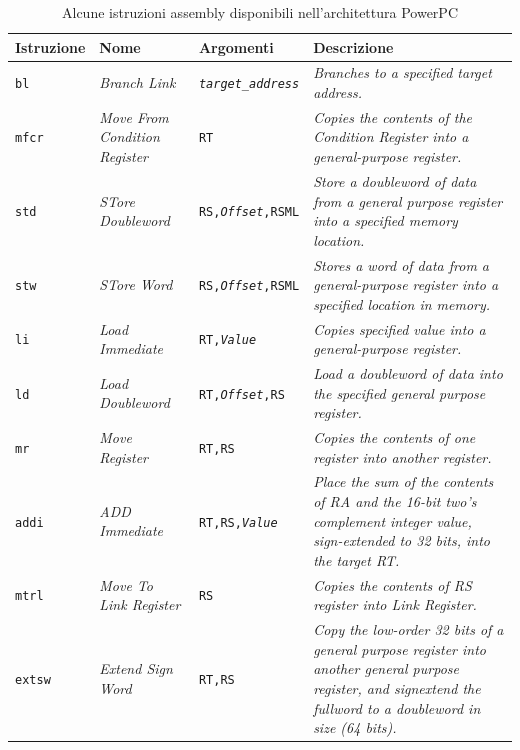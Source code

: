 \documentclass[10pt,a4paper, titlepage]{report}
\begin{document}
	\begin{table}[h!]
	    \caption{Alcune istruzioni assembly disponibili nell'architettura PowerPC\texttrademark}
	    \centering
	    
	    \label{tab:AssemblyIstrucions}
	    \begin{adjustbox}{center=\textwidth}
	    \begin{tabular}{l|l|l|p{6cm}}
	      \toprule
	      Istruzione & Nome & Argomenti & Descrizione \\
	   		\midrule
	   		\texttt{bl} & \textit{Branch Link} & \texttt{\textit{target\_address}} & \textit{Branches to a specified target address.} \\
	   	\hline
   	       \texttt{mfcr} & \textit{Move From Condition Register} & \texttt{RT} & \textit{Copies the contents of the Condition Register into a general-purpose register.} \\
 \hline
	       \texttt{std} & \textit{STore Doubleword} & \texttt{RS,\textit{Offset},RSML} & \textit{Store a doubleword of data from a general purpose register into a specified memory location.}\\
	      \hline 
	       \texttt{stw} & \textit{STore Word} & \texttt{RS,\textit{Offset},RSML} & \textit{Stores a word of data from a general-purpose register into a specified location in memory.} \\
	       \hline
	       \texttt{li} & \textit{Load Immediate} & \texttt{RT,\textit{Value}} & \textit{Copies specified value into a general-purpose register.} \\
	       \hline
	       \texttt{ld} & \textit{Load Doubleword} & \texttt{RT,\textit{Offset},RS} & \textit{Load a doubleword of data into the specified general purpose register.} \\
	       \hline
	       \texttt{mr} & \textit{Move Register} & \texttt{RT,RS} & \textit{Copies the contents of one register into another register.} \\
	       \hline
	       \texttt{addi} & \textit{ADD Immediate} & \texttt{RT,RS,\textit{Value}} & \textit{Place the sum of the contents of RA and the 16-bit two's complement integer value, sign-extended to 32 bits, into the target RT.} \\
	       	\hline
	       	\texttt{mtrl} & \textit{Move To Link Register} & \texttt{RS} & \textit{Copies the contents of RS register into Link Register.} \\
\hline
\texttt{extsw} & \textit{Extend Sign Word} & \texttt{RT,RS} & \textit{Copy the low-order 32 bits of a general purpose register into another general purpose register, and signextend the fullword to a doubleword in size (64 bits).} \\
	       	
	     
	      \bottomrule
	    \end{tabular}
	       \end{adjustbox}
	\end{table}
\end{document}
